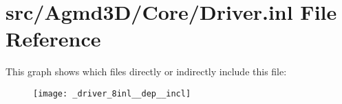 \hypertarget{_driver_8inl}{\section{src/\+Agmd3\+D/\+Core/\+Driver.inl File Reference}
\label{_driver_8inl}
}
This graph shows which files directly or indirectly include this file\+:\nopagebreak
\begin{figure}[H]
\begin{center}
\leavevmode
\texttt{[image: \_driver\_8inl\_\_dep\_\_incl]}
\end{center}
\end{figure}
